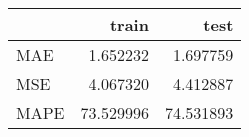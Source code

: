 \begin{tabular}{lrr}
\toprule
{} &      train &       test \\
\midrule
MAE  &   1.652232 &   1.697759 \\
MSE  &   4.067320 &   4.412887 \\
MAPE &  73.529996 &  74.531893 \\
\bottomrule
\end{tabular}
